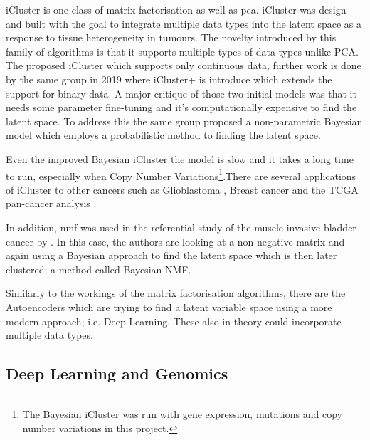 iCluster \cite{Shen2009-ew, Mo2013-zi, Mo2018-el} is one class of matrix factorisation as well as \acrlong{pca}. iCluster was design and built with the goal to integrate multiple data types into the latent space as a response to tissue heterogeneity in tumours. The novelty introduced by this family of algorithms is that it supports multiple types of data-types unlike PCA. The \citet{Shen2009-ew} proposed iCluster which supports only continuous data, further work is done by the same group in 2019 \citet{Mo2013-zi} where iCluster+ is introduce which extends the support for binary data. A major critique of those two initial models was that it needs some parameter fine-tuning and it's computationally expensive to find the latent space. To address this the same group proposed a non-parametric Bayesian model \citet{Mo2018-el} which employs a probabilistic method to finding the latent space. 

Even the improved Bayesian iCluster the model is slow and it takes a long time to run, especially when Copy Number Variations\footnote{The Bayesian iCluster was run with gene expression, mutations and copy number variations in this project.}.There are several applications of iCluster to other cancers such as Glioblastoma \cite{Shen2012-yj},  Breast cancer \citet{Curtis2012-ff} and the TCGA pan-cancer analysis \citet{Hoadley2018-qe}.

In addition, \acrfull{nmf} was used in the referential study of the muscle-invasive bladder cancer by \citet{Robertson2017-mg}. In this case, the authors are looking at a non-negative matrix and again using a Bayesian approach to find the latent space which is then later clustered; a method called Bayesian NMF.

Similarly to the workings of the matrix factorisation algorithms, there are the Autoencoders which are trying to find a latent variable space using a more modern approach; i.e. Deep Learning. These also in theory could incorporate multiple data types.

\subsection{Deep Learning  and Genomics} \label{s:lit:dl_genomics}

\vspace{3mm}
\vspace{3mm}

